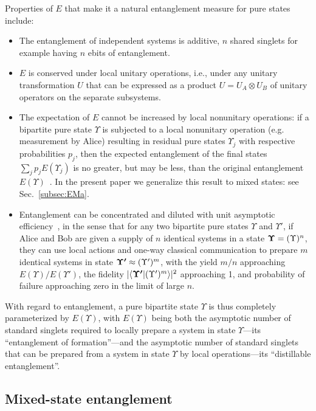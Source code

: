 Properties of $E$ that make it a natural entanglement measure for pure
states include:
\begin{itemize}
\item
The entanglement of independent systems is additive, $n$ shared
singlets for example having $n$ ebits of entanglement.
\item
$E$ is conserved under local unitary operations, i.e., under any unitary
transformation $U$ that can be expressed as a product $U=U_A\otimes
U_B$ of unitary operators on the separate subsystems.
\item
The expectation of $E$ cannot be increased by local nonunitary operations:
if a bipartite
pure state $\Upsilon$ is subjected to a local nonunitary operation (e.g.
measurement by Alice) resulting in residual pure states $\Upsilon_j$
with respective probabilities $p_j$, then the expected entanglement of
the final states $\sum_j p_jE(\Upsilon_j)$ is no greater, but may be
less, than the original entanglement
$E(\Upsilon)$~\cite{Concentration}. In the present paper we generalize
this result to mixed states: see Sec.~\ref{subsec:EMa}.
 \item
Entanglement can be concentrated and diluted with unit asymptotic
efficiency~\cite{Concentration}, in the sense that for any two bipartite
pure states $\Upsilon$ and $\Upsilon'$, if Alice and Bob are given a
supply of $n$ identical systems in a state
$\mbox{\boldmath$\Upsilon$}=(\Upsilon)^n$, they can use local actions
and one-way classical communication to prepare $m$ identical systems in
state $\mbox{\boldmath$\Upsilon'$}\approx(\Upsilon')^m$, with the yield
$m/n$ approaching $E(\Upsilon)/E(\Upsilon')$, the fidelity
$|\langle \mbox{\boldmath$\Upsilon'$} | (\Upsilon')^m \rangle|^2$ approaching 1,
and probability of failure approaching zero in the limit of large $n$.
 \end{itemize}
With regard to entanglement, a pure bipartite state $\Upsilon$ is thus
completely parameterized by $E(\Upsilon)$, with $E(\Upsilon)$ being
both the asymptotic number of standard singlets required to locally
prepare a system in state $\Upsilon$---its ``entanglement of
formation''---and the asymptotic number of standard singlets that can
be prepared from a system in state $\Upsilon$ by local
operations---its ``distillable entanglement''.
 
\subsection{Mixed-state entanglement}
\label{subsec:mse}
 
